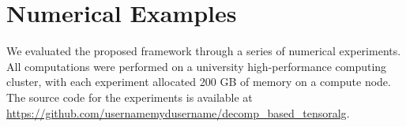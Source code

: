 \documentclass[onefignum,onetabnum]{siamart250211}
\begin{document}








\section{Numerical Examples} \label{sec:numeg}
We evaluated the proposed framework through a series of numerical experiments. All computations were performed on a university high-performance computing cluster, with each experiment allocated 200 GB of memory on a compute node. The source code for the experiments is available at \url{https://github.com/usernamemydusername/decomp_based_tensoralg}.
\end{document}
